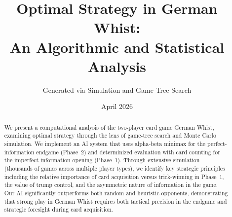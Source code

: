 \documentclass[11pt,a4paper]{article}
\title{Optimal Strategy in German Whist:\\An Algorithmic and Statistical Analysis}
\author{Generated via Simulation and Game-Tree Search}
\date{April 2026}
\begin{document}
\maketitle

\begin{abstract}
We present a computational analysis of the two-player card game German Whist,
examining optimal strategy through the lens of game-tree search and Monte Carlo
simulation. We implement an AI system that uses alpha-beta minimax for the
perfect-information endgame (Phase~2) and determinized evaluation with card
counting for the imperfect-information opening (Phase~1). Through extensive
simulation (thousands of games across multiple player types), we identify key
strategic principles including the relative importance of card acquisition
versus trick-winning in Phase~1, the value of trump control, and the
asymmetric nature of information in the game. Our AI significantly outperforms
both random and heuristic opponents, demonstrating that strong play in German
Whist requires both tactical precision in the endgame and strategic foresight
during card acquisition.
\end{abstract}

\tableofcontents









\printbibliography
\end{document}
